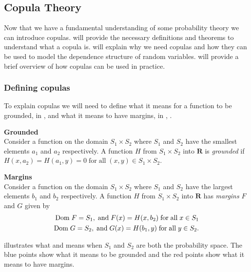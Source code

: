 \subsection{Copula Theory}\label{sec:CopulaTheory}
Now that we have a fundamental understanding of some probability theory we can introduce copulas.  will provide the necessary definitions and theorems to understand what a copula is.  will explain why we need copulas and how they can be used to model the dependence structure of random variables.  will provide a brief overview of how copulas can be used in practice.

\subsubsection{Defining copulas}\label{sec:DefiningCopulas}
To explain copulas we will need to define what it means for a function to be grounded, in , and what it means to have margins, in , .

\begin{definition}\label{def:grounded}\textbf{Grounded} \\
    Consider a function on the domain $S_1\times S_2$ where $S_1$ and $S_2$ have the smallest elements $a_1$ and $a_2$ respectively. A function $H$ from $S_1\times S_2$ into $\mathbf{R}$ is \emph{grounded} if $H(x,a_2)= H(a_1,y) = 0 \;\mathrm{for \;all\;} (x,y) \in S_1\times S_2.$
\end{definition}

\begin{definition}\label{def:margins}
    \textbf{Margins}\\
    Consider a function on the domain $S_1\times S_2$ where $S_1$ and $S_2$ have the largest elements $b_1$ and $b_2$ respectively. A function $H$ from $S_1\times S_2$ into $\mathbf{R}$ has \emph{margins} $F$ and $G$ given by
    \begin{align*}
        \mathrm{Dom \;} F = S_1, \;\mathrm{and }\; F(x) = H(x,b_2) \;\mathrm{for \;all\;} x \in S_1\\
        \mathrm{Dom \;} G = S_2, \;\mathrm{and }\; G(x) = H(b_1,y) \;\mathrm{for \;all\;} y \in S_2.
    \end{align*}
\end{definition}

 illustrates what  and  means when $S_1$ and $S_2$ are both the probability space. The blue points show what it means to be grounded and the red points show what it means to have margins. 

